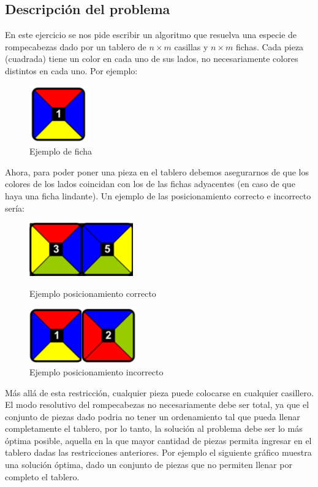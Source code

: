 \subsection{Descripci\'on del problema}

En este ejercicio se nos pide escribir un algoritmo que resuelva una especie de rompecabezas dado por un tablero de $n \times m$ casillas y $n \times m$ fichas.
Cada pieza (cuadrada) tiene un color en cada uno de sus lados, no necesariamente colores distintos en cada uno. Por ejemplo: 

\begin{figure}[h]
\begin{center}
\includegraphics[scale=0.4]{./img/ej3_fichas.png}
\caption{Ejemplo de ficha}
\end{center}
\end{figure}

Ahora, para poder poner una pieza en el tablero debemos asegurarnos de que los colores de los lados coincidan con los de las fichas adyacentes (en caso de que haya una ficha lindante). Un ejemplo de las posicionamiento correcto e incorrecto ser\'ia:\\

\begin{figure}[h]
\begin{center}
\includegraphics[scale=0.4]{./img/ej3_fichas_coinciden.png}
\caption{Ejemplo posicionamiento correcto}
\includegraphics[scale=0.4]{./img/ej3_fichas_ncoinciden.png}
\caption{Ejemplo posicionamiento incorrecto}
\end{center}
\end{figure}

 M\'as all\'a de esta restricci\'on, cualquier pieza puede colocarse en cualquier casillero.\\
El modo resolutivo del rompecabezas no necesariamente debe ser total, ya que el conjunto de piezas dado podria no tener un ordenamiento tal que pueda llenar completamente el tablero, por lo tanto, la soluci\'on al problema debe ser lo m\'as \'optima posible, aquella en la que mayor cantidad de piezas permita ingresar en el tablero dadas las restricciones anteriores.
Por ejemplo el siguiente gr\'afico muestra una soluci\'on \'optima, dado un conjunto de piezas que no permiten llenar por completo el tablero.

